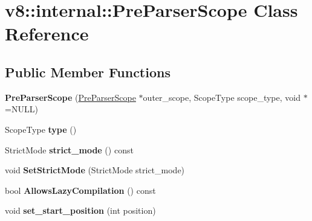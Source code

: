 \hypertarget{classv8_1_1internal_1_1_pre_parser_scope}{}\section{v8\+:\+:internal\+:\+:Pre\+Parser\+Scope Class Reference}
\label{classv8_1_1internal_1_1_pre_parser_scope}
\subsection*{Public Member Functions}
\begin{DoxyCompactItemize}
\item 
\hypertarget{classv8_1_1internal_1_1_pre_parser_scope_a9e85c6150d0378e0ff86b68c179883b0}{}{\bfseries Pre\+Parser\+Scope} (\hyperlink{classv8_1_1internal_1_1_pre_parser_scope}{Pre\+Parser\+Scope} $\ast$outer\+\_\+scope, Scope\+Type scope\+\_\+type, void $\ast$=N\+U\+L\+L)\label{classv8_1_1internal_1_1_pre_parser_scope_a9e85c6150d0378e0ff86b68c179883b0}

\item 
\hypertarget{classv8_1_1internal_1_1_pre_parser_scope_a2e49f1ca800afd37866500bbb02c7b0b}{}Scope\+Type {\bfseries type} ()\label{classv8_1_1internal_1_1_pre_parser_scope_a2e49f1ca800afd37866500bbb02c7b0b}

\item 
\hypertarget{classv8_1_1internal_1_1_pre_parser_scope_a9f590417f35cebdc88f3a8d3e210e9eb}{}Strict\+Mode {\bfseries strict\+\_\+mode} () const \label{classv8_1_1internal_1_1_pre_parser_scope_a9f590417f35cebdc88f3a8d3e210e9eb}

\item 
\hypertarget{classv8_1_1internal_1_1_pre_parser_scope_a7fe5067e2039dce40fc6f2bdc909a4be}{}void {\bfseries Set\+Strict\+Mode} (Strict\+Mode strict\+\_\+mode)\label{classv8_1_1internal_1_1_pre_parser_scope_a7fe5067e2039dce40fc6f2bdc909a4be}

\item 
\hypertarget{classv8_1_1internal_1_1_pre_parser_scope_a544f0018be119cc782f5ff955cb4ac37}{}bool {\bfseries Allows\+Lazy\+Compilation} () const \label{classv8_1_1internal_1_1_pre_parser_scope_a544f0018be119cc782f5ff955cb4ac37}

\item 
\hypertarget{classv8_1_1internal_1_1_pre_parser_scope_a5054625d985140d2f1e77f9f929c53e9}{}void {\bfseries set\+\_\+start\+\_\+position} (int position)\label{classv8_1_1internal_1_1_pre_parser_scope_a5054625d985140d2f1e77f9f929c53e9}


\end{DoxyCompactItemize}
